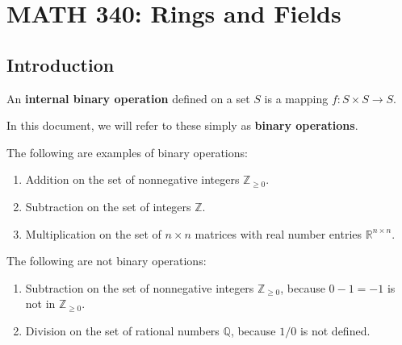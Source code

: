\documentclass{scrartcl}
\begin{document}
\section{MATH 340: Rings and Fields}

\subsection{Introduction}

\begin{definition}
    \label{def:binary operation}
    \newcommand{\Q}{\mathbb{Q}}
    \newcommand{\R}{\mathbb{R}}
    \newcommand{\Z}{\mathbb{Z}}
    An \textbf{internal binary operation} defined on a set $S$ is a mapping $f:S\times S\to S$.

    In this document, we will refer to these simply as \textbf{binary operations}.

    The following are examples of binary operations:
    \begin{enumerate}
        \item Addition on the set of nonnegative integers $\Z_{\geq 0}$.
        \item Subtraction on the set of integers $\Z$.
        \item Multiplication on the set of $n\times n$ matrices with real number entries $\R^{n\times n}$.
    \end{enumerate}

    The following are not binary operations:
    \begin{enumerate}
        \item Subtraction on the set of nonnegative integers $\Z_{\geq 0}$, because $0-1=-1$ is not in $\Z_{\geq 0}$.
        \item Division on the set of rational numbers $\Q$, because $1/0$ is not defined.
    \end{enumerate}
\end{definition}
\end{document}
